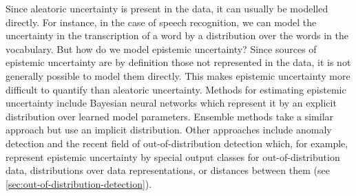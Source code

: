 Since aleatoric uncertainty is present in the data, it can usually be modelled directly. For instance, in the case of speech recognition, we can model the uncertainty in the transcription of a word by a distribution over the words in the vocabulary. But how do we model epistemic uncertainty? 
Since sources of epistemic uncertainty are by definition those not represented in the data, it is not generally possible to model them directly. This makes epistemic uncertainty more difficult to quantify than aleatoric uncertainty. 
Methods for estimating epistemic uncertainty include Bayesian neural networks \parencite{mackay_practical_1992, neal_bayesian_1995} which represent it by an explicit distribution over learned model parameters. Ensemble methods \parencite{gal_dropout_2016,lakshminarayanan_simple_2017} take a similar approach but use an implicit distribution. 
Other approaches include anomaly detection and the recent field of out-of-distribution detection which, for example, represent epistemic uncertainty by special output classes for out-of-distribution data, distributions over data representations, or distances between them (see \cref{sec:out-of-distribution-detection}). 



